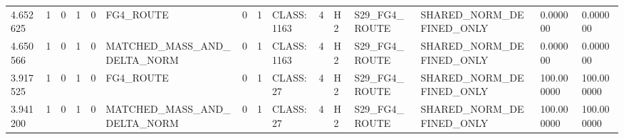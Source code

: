 \begin{tabular}{lllllllllllllll}
4.652625 & 1 & 0 & 1 & 0 & FG4\_ROUTE & 0 & 1 & CLASS:1163 & 4 & H2 & S29\_FG4\_ROUTE & SHARED\_NORM\_DEFINED\_ONLY & 0.000000 & 0.000000 \\
4.650566 & 1 & 0 & 1 & 0 & MATCHED\_MASS\_AND\_DELTA\_NORM & 0 & 1 & CLASS:1163 & 4 & H2 & S29\_FG4\_ROUTE & SHARED\_NORM\_DEFINED\_ONLY & 0.000000 & 0.000000 \\
3.917525 & 1 & 0 & 1 & 0 & FG4\_ROUTE & 0 & 1 & CLASS:27 & 4 & H2 & S29\_FG4\_ROUTE & SHARED\_NORM\_DEFINED\_ONLY & 100.000000 & 100.000000 \\
3.941200 & 1 & 0 & 1 & 0 & MATCHED\_MASS\_AND\_DELTA\_NORM & 0 & 1 & CLASS:27 & 4 & H2 & S29\_FG4\_ROUTE & SHARED\_NORM\_DEFINED\_ONLY & 100.000000 & 100.000000 \\
\bottomrule
\end{tabular}
